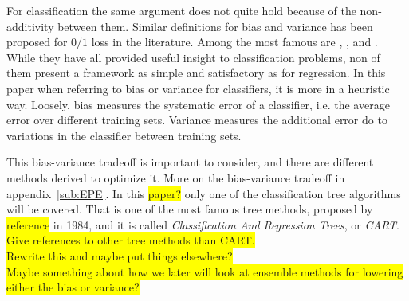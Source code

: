 For classification the same argument does not quite hold because of the non-additivity between them. Similar definitions for bias and variance has been proposed for $0/1$ loss in the literature. Among the most famous are \cite{kong1995error}, \cite{kohavi1996bias}, \cite{breiman1996bias} and \cite{Friedman1997bias}. While they have all provided useful insight to classification problems, non of them present a framework as simple and satisfactory as for regression. In this paper when referring to bias or variance for classifiers, it is more in a heuristic way. Loosely, bias measures the systematic error of a classifier, i.e. the average error over different training sets. Variance measures the additional error do to variations in the classifier between training sets. 

This bias-variance tradeoff is important to consider, and there are different methods derived to optimize it. More on the bias-variance tradeoff in appendix~\ref{sub:EPE}. In this \colorbox{yellow}{paper?} only one of the classification tree algorithms will be covered. That is one of the most famous tree methods, proposed by \colorbox{yellow}{reference} \cite{breiman} in 1984, and it is called \textit{Classification And Regression Trees}, or \textit{CART}.
\\ \colorbox{yellow}{Give references to other tree methods than CART.}
\\ \colorbox{yellow}{Rewrite this and maybe put things elsewhere?} 
\\ \colorbox{yellow}{Maybe something about how we later will look at ensemble methods for lowering either the bias or variance?}
%
